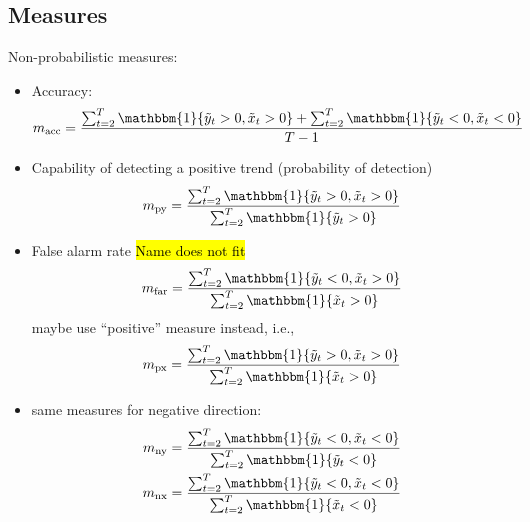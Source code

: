 \documentclass[oneside]{article}
\theoremstyle{plain}%
\theoremstyle{definition}
\newcommand{\ind}[1]{\mathbbm{1}\{#1\}}
\newcommand{\ydiff}{\tilde{y}}
\newcommand{\xdiff}{\tilde{x}}
\begin{document}
\subsection{Measures}


Non-probabilistic measures:

\begin{itemize}
  \item Accuracy: \begin{equation}
  	m_{\text{acc}} = \frac{\sum_{t=2}^T \ind{\ydiff_t > 0, \xdiff_t > 0} + \sum_{t=2}^T \ind{\ydiff_t < 0, \xdiff_t < 0}}{T-1}
\end{equation}
	\item Capability of detecting a positive trend (probability of detection)
	\begin{equation}
  		m_{\text{py}} = \frac{\sum_{t=2}^T \ind{\ydiff_t > 0, \xdiff_t > 0}}{\sum_{t=2}^T \ind{\ydiff_t > 0}}
	\end{equation}
	\item False alarm rate \hl{Name does not fit} \begin{equation}
  m_{\text{far}} = \frac{\sum_{t=2}^T \ind{\ydiff_t < 0, \xdiff_t > 0}}{\sum_{t=2}^T \ind{\xdiff_t > 0}}
\end{equation}
maybe use \enquote{positive} measure instead, i.e.,
\begin{equation}
  m_{\text{px}} = \frac{\sum_{t=2}^T \ind{\ydiff_t > 0, \xdiff_t > 0}}{\sum_{t=2}^T \ind{\xdiff_t > 0}}  
\end{equation}
	\item same measures for negative direction:
	\begin{align}
		m_{\text{ny}} &=  \frac{\sum_{t=2}^T \ind{\ydiff_t < 0, \xdiff_t < 0}}{\sum_{t=2}^T \ind{\ydiff_t < 0}} \\
		m_{\text{nx}} &=  \frac{\sum_{t=2}^T \ind{\ydiff_t < 0, \xdiff_t < 0}}{\sum_{t=2}^T \ind{\xdiff_t < 0}}
	\end{align}
\end{itemize}
\end{document}
